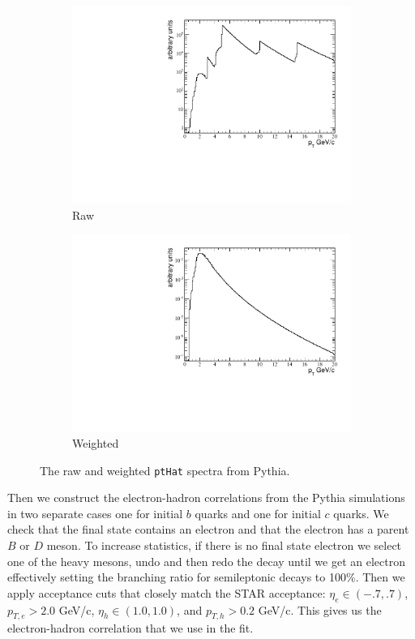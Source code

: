 \begin{figure}[htbp]
	\begin{subfigure}{0.5\textwidth}
		\includegraphics[width=\textwidth]{Plots/Correlations/pthat_raw.pdf}
		\caption{Raw}
		\label{fig:PythiaProcessa}
	\end{subfigure}	
	\begin{subfigure}{0.5\textwidth}
		\includegraphics[width=\textwidth]{Plots/Correlations/pthat_weighted.pdf}
		\caption{Weighted}
		\label{fig:PythiaProcessb}
	\end{subfigure}	
\caption[Raw and Weighted Pythia Generated Hard Processes]{The raw and weighted \texttt{ptHat} spectra from Pythia.}
\label{fig:PythiaProcess}
\end{figure}

Then we construct the electron-hadron correlations from the Pythia simulations in two separate cases one for initial $b$ quarks and one for initial $c$ quarks. We check that the final state contains an electron and that the electron has a parent $B$ or $D$ meson. To increase statistics, if there is no final state electron we select one of the heavy mesons, undo and then redo the decay until we get an electron effectively setting the branching ratio for semileptonic decays to 100\%. Then we apply acceptance cuts that closely match the STAR acceptance: $\eta_e \in (-.7,.7)$, $p_{T,e} > 2.0$ GeV/c, $\eta_h \in (1.0,1.0)$, and $p_{T,h} > 0.2$ GeV/c. This gives us the electron-hadron correlation that we use in the fit. 

